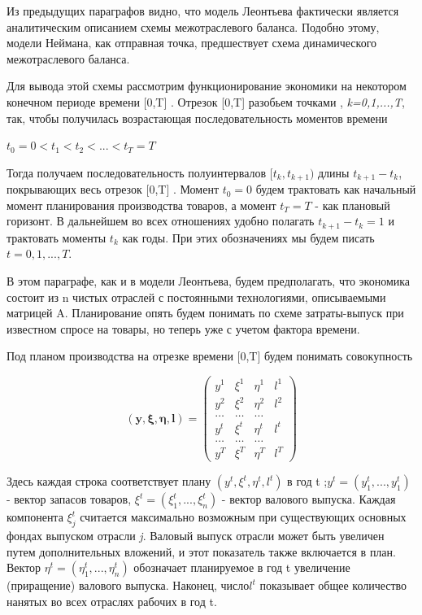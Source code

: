 \documentclass[12pt, 4paper]{book}
\begin{document}
{Из предыдущих параграфов видно, что модель Леонтьева фактически является аналитическим описанием схемы межотраслевого баланса. Подобно этому, модели Неймана, как отправная точка, предшествует схема динамического межотраслевого баланса.
\par

Для вывода этой схемы рассмотрим функционирование экономики на некотором конечном периоде времени [0,T] . Отрезок [0,T] разобьем точками , \textit{k=0,1,...,T}, так, чтобы получилась возрастающая последовательность моментов времени
\begin{center}
$t_0=0 < t_1 < t_2 < ... < t_T = T$
\end{center}
Тогда получаем последовательность полуинтервалов $[ t_k,t_{k+1})$ длины $t_{k+1}-t_k$, покрывающих весь отрезок [0,T] . Момент $t_0 = 0$ будем трактовать как начальный момент планирования производства товаров, а момент $t_T = T$ - как плановый горизонт. В дальнейшем во всех отношениях удобно полагать $t_{k+1}-t_k = 1$ и трактовать моменты $t_{k}$ как годы. При этих обозначениях мы будем писать $t=0,1,...,T$.
\par

В этом параграфе, как и в модели Леонтьева, будем предполагать, что экономика состоит из n чистых отраслей с постоянными технологиями, описываемыми матрицей A. Планирование опять будем понимать по схеме затраты-выпуск при известном спросе на товары, но теперь уже с учетом фактора времени.
\par

Под планом производства на отрезке времени [0,T] будем понимать совокупность
\begin{center}
\begin{displaymath}
\mathbf{(y,\xi,\eta,l)} =
\left( \begin{array}{cccc}
y^1 & \xi^1 & \eta^1 & l^1 \\
y^2 & \xi^2 & \eta^2 & l^2 \\
\ldots & \ldots & \ldots \\
y^t & \xi^t & \eta^t & l^t \\
\ldots & \ldots & \ldots \\
y^T & \xi^T & \eta^T & l^T 
\end{array} \right)
\end{displaymath}
\end{center}
\par

Здесь каждая строка соответствует плану $(y^t , \xi^t , \eta^t , l^t)$ в год t ;$y^t = (y_{1}^t,...,y_{1}^t)$ - вектор запасов товаров, $\xi^t=(\xi_{1}^t,...,\xi_{n}^t)$ - вектор валового выпуска. Каждая компонента $\xi_{j}^t$ считается максимально возможным при существующих основных фондах выпуском отрасли \textit{j}. Валовый выпуск отрасли может быть увеличен путем дополнительных вложений, и этот показатель также включается в план. Вектор $\eta^t = (\eta_{1}^t,...,\eta_{n}^t)$ обозначает планируемое в год t увеличение (приращение) валового выпуска. Наконец, число$l^t$ показывает общее количество нанятых во всех отраслях рабочих в год t.
\par

}
\end{document}
